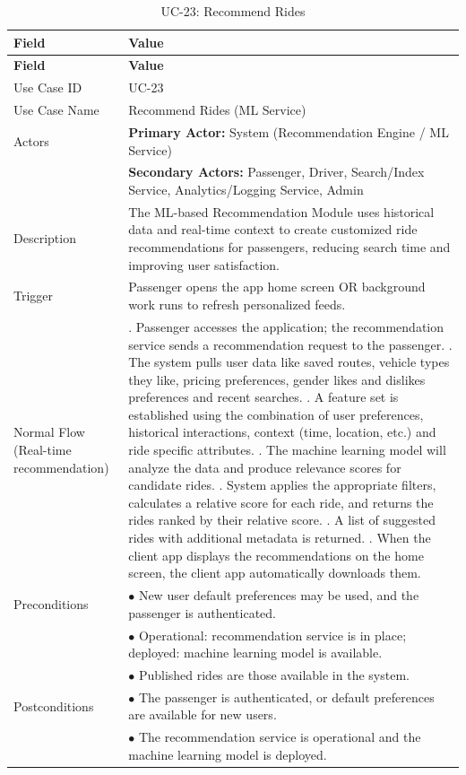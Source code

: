 \begin{longtable}{|>{\raggedright\arraybackslash}p{4cm}|>{\raggedright\arraybackslash}p{11cm}|}
\caption{UC-23: Recommend Rides}
\label{tab:uc-23} \\
\hline
\rowcolor{lightgray!30}
\textbf{Field} & \textbf{Value} \\
\hline
\endfirsthead
\hline
\rowcolor{lightgray!30}
\textbf{Field} & \textbf{Value} \\
\hline
\endhead
\hline
\endfoot
\hline
\endlastfoot
Use Case ID & UC-23 \\
\hline
Use Case Name & Recommend Rides (ML Service) \\
\hline
Actors & \textbf{Primary Actor:} System (Recommendation Engine / ML Service) \\
& \textbf{Secondary Actors:} Passenger, Driver, Search/Index Service, Analytics/Logging Service, Admin \\
\hline
Description & The ML-based Recommendation Module uses historical data and real-time context to create customized ride recommendations for passengers, reducing search time and improving user satisfaction. \\
\hline
Trigger & Passenger opens the app home screen OR background work runs to refresh personalized feeds. \\
\hline
Normal Flow (Real-time recommendation) & 1. Passenger accesses the application; the recommendation service sends a recommendation request to the passenger. \newline 2. The system pulls user data like saved routes, vehicle types they like, pricing preferences, gender likes and dislikes preferences and recent searches. \newline 3. A feature set is established using the combination of user preferences, historical interactions, context (time, location, etc.) and ride specific attributes. \newline 4. The machine learning model will analyze the data and produce relevance scores for candidate rides. \newline 5. System applies the appropriate filters, calculates a relative score for each ride, and returns the rides ranked by their relative score. \newline 6. A list of suggested rides with additional metadata is returned. \newline 7. When the client app displays the recommendations on the home screen, the client app automatically downloads them. \\
\hline
Preconditions & $\bullet$ New user default preferences may be used, and the passenger is authenticated. \\
& $\bullet$ Operational: recommendation service is in place; deployed: machine learning model is available. \\
& $\bullet$ Published rides are those available in the system. \\
\hline
Postconditions & $\bullet$ The passenger is authenticated, or default preferences are available for new users. \\
& $\bullet$ The recommendation service is operational and the machine learning model is deployed. \\


\end{longtable}
